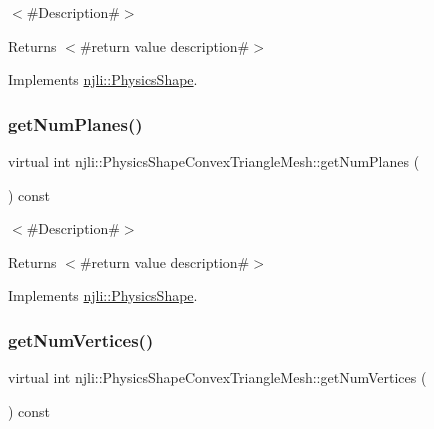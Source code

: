 $<$\#\+Description\#$>$

\begin{DoxyReturn}{Returns}
$<$\#return value description\#$>$ 
\end{DoxyReturn}


Implements \mbox{\hyperlink{classnjli_1_1_physics_shape_a24df999ba2b7ac0d9abda09c4f17c2fe}{njli\+::\+Physics\+Shape}}.

\mbox{\label{classnjli_1_1_physics_shape_convex_triangle_mesh_a4a79b73e99c68e69332d5603f9c825f0}} 
\subsubsection{\texorpdfstring{get\+Num\+Planes()}{getNumPlanes()}}
{\footnotesize\ttfamily virtual int njli\+::\+Physics\+Shape\+Convex\+Triangle\+Mesh\+::get\+Num\+Planes (\begin{DoxyParamCaption}{ }\end{DoxyParamCaption}) const\hspace{0.3cm}{\ttfamily [virtual]}}

$<$\#\+Description\#$>$

\begin{DoxyReturn}{Returns}
$<$\#return value description\#$>$ 
\end{DoxyReturn}


Implements \mbox{\hyperlink{classnjli_1_1_physics_shape_a11cb80220393bfce177b8bdc34f7f359}{njli\+::\+Physics\+Shape}}.

\mbox{\label{classnjli_1_1_physics_shape_convex_triangle_mesh_aef5d4654e20f1c128b350867c2ea8eb6}} 
\subsubsection{\texorpdfstring{get\+Num\+Vertices()}{getNumVertices()}}
{\footnotesize\ttfamily virtual int njli\+::\+Physics\+Shape\+Convex\+Triangle\+Mesh\+::get\+Num\+Vertices (\begin{DoxyParamCaption}{ }\end{DoxyParamCaption}) const\hspace{0.3cm}{\ttfamily [virtual]}}

